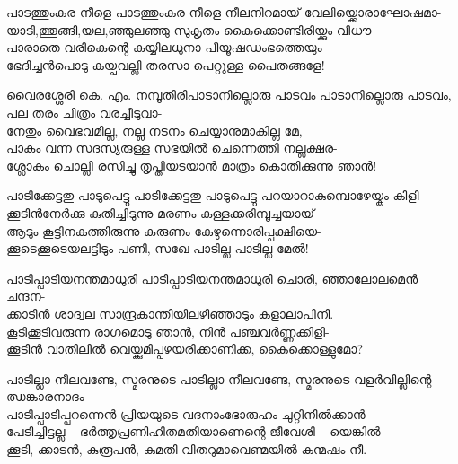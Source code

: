 \begin{enumerate}

\begin{slokam}{\VSv}{\CN}{പാടത്തുംകര നീളെ}
പാടത്തുംകര നീളെ നീലനിറമായ്‌ വേലിയ്ക്കൊരാഘോഷമാ-\\
യാടി,ത്തൂങ്ങി,യല,ഞ്ഞുലഞ്ഞു സുകൃതം കൈക്കൊണ്ടിരിയ്ക്കും വിധൗ\\
പാരാതെ വരികെന്റെ കയ്യിലധുനാ പീയൂഷഡംഭത്തെയും\\
ഭേദിച്ചൻപൊടു കയ്പവല്ലി തരസാ പെറ്റുള്ള പൈതങ്ങളേ!
\end{slokam}


\begin{slokam}{\VSv}{വൈരശ്ശേരി കെ. എം. നമ്പൂതിരി}{പാടാനില്ലൊരു പാടവം}
പാടാനില്ലൊരു പാടവം, പല തരം ചിത്രം വരച്ചീടുവാ-\\
നേതും വൈഭവമില്ല, നല്ല നടനം ചെയ്യാനുമാകില്ല മേ,\\
പാകം വന്ന സദസ്യരുള്ള സഭയിൽ ചെന്നെത്തി നല്ലക്ഷര-\\
ശ്ലോകം ചൊല്ലി രസിച്ചു തൃപ്തിയടയാൻ മാത്രം കൊതിക്കുന്നു ഞാൻ! 
\end{slokam}



\begin{slokam}{\VSv}{\VKG}{പാടിക്കേട്ടതു പാടുപെട്ടു}
പാടിക്കേട്ടതു പാടുപെട്ടു പറയാറാകുമ്പൊഴേയ്കും കിളി-\\
ക്കൂടിൻനേർക്കു കുതിച്ചിടുന്നു മരണം കള്ളക്കരിമ്പൂച്ചയായ്‌\\
ആടും കൂട്ടിനകത്തിരുന്നു കരുണം കേഴുന്നൊരിപ്പക്ഷിയെ-\\
ക്കൂടെക്കൂടെയലട്ടിടും പണി, സഖേ പാടില്ല പാടില്ല മേൽ!
\end{slokam}



\begin{slokam}{\VSv}{\Unk}{പാടിപ്പാടിയനന്തമാധുരി}
പാടിപ്പാടിയനന്തമാധുരി ചൊരി, ഞ്ഞാലോലമെൻ ചന്ദന-\\
ക്കാടിൻ ശാദ്വല സാന്ദ്രകാന്തിയിലഴിഞ്ഞാടും കളാലാപിനി.\\
കൂടിക്കൂടിവരുന്ന രാഗമൊടു ഞാൻ, നിൻ പഞ്ചവർണ്ണക്കിളി-\\
ക്കൂടിൻ വാതിലിൽ വെയ്ക്കുമിപ്പഴയരിക്കാണിക്ക, കൈക്കൊള്ളുമോ?
\end{slokam}



\begin{slokam}{\VSr}{\PG}{പാടില്ലാ നീലവണ്ടേ, സ്മരനുടെ}
പാടില്ലാ നീലവണ്ടേ, സ്മരനുടെ വളർവില്ലിന്റെ ഝങ്കാരനാദം\\
പാടിപ്പാടിപ്പറന്നെൻ പ്രിയയുടെ വദനാംഭോരുഹം ചുറ്റിനിൽക്കാൻ\\
പേടിച്ചിട്ടല്ല -- ഭർത്തൃപ്രണിഹിതമതിയാണെന്റെ ജീവേശി -- യെങ്കിൽ--\\
ക്കൂടി, ക്കാടൻ, കുരൂപൻ, കുമതി വിതറുമാവെണ്മയിൽ കന്മഷം നീ.
\end{slokam}


\end{enumerate}
